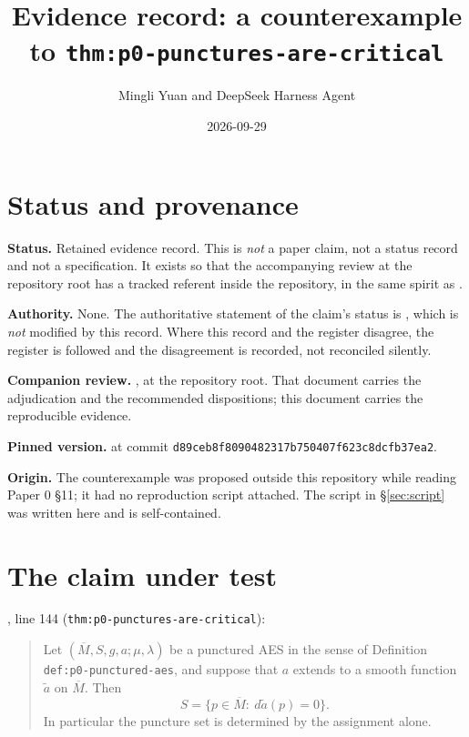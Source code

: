 \documentclass[11pt]{article}
\title{Evidence record: a counterexample to \texttt{thm:p0-punctures-are-critical}}
\author{Mingli Yuan and DeepSeek Harness Agent}
\date{2026-09-29}
\begin{document}
\maketitle

\section{Status and provenance}
\label{sec:status}

\textbf{Status.} Retained evidence record. This is \emph{not} a paper claim, not
a status record and not a specification. It exists so that the accompanying
review at the repository root has a tracked referent inside the repository, in
the same spirit as
.

\textbf{Authority.} None. The authoritative statement of the claim's status is
, which is \emph{not} modified by
this record. Where this record and the register disagree, the register is
followed and the disagreement is recorded, not reconciled silently.

\textbf{Companion review.}
, at the
repository root. That document carries the adjudication and the recommended
dispositions; this document carries the reproducible evidence.

\textbf{Pinned version.}  at commit
\texttt{d89ceb8f8090482317b750407f623c8dcfb37ea2}.

\textbf{Origin.} The counterexample was proposed outside this repository while
reading Paper 0 \S11; it had no reproduction script attached. The script in
\S\ref{sec:script} was written here and is self-contained.

\section{The claim under test}
\label{sec:claim}

, line 144 (\texttt{thm:p0-punctures-are-critical}):

\begin{quote}
Let $(\overline M,S,g,a;\mu,\lambda)$ be a punctured AES in the sense of
Definition \texttt{def:p0-punctured-aes}, and suppose that $a$ extends to a smooth
function $\widetilde a$ on $\overline M$. Then
\[
S=\bigl\{p\in\overline M:\ d\widetilde a(p)=0\bigr\}.
\]
In particular the puncture set is determined by the assignment alone.
\end{quote}
\end{document}
